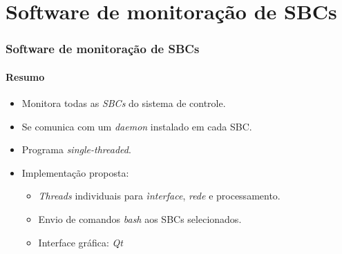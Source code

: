 \section{Software de monitoração de SBCs}

\begin{frame}
\frametitle{Software de monitoração de SBCs}
\framesubtitle{Resumo}

\begin{itemize}
  \item Monitora todas as \textit{SBCs} do sistema de controle.
  \vspace{12pt}
  \item	Se comunica com um \textit{daemon} instalado em cada SBC.
  \vspace{12pt}
  \item Programa \textit{single-threaded}.
  \vspace{12pt}
  \item Implementação proposta:
  \begin{itemize}
    \item \textit{Threads} individuais para \textit{ìnterface}, \textit{rede} e
    processamento.
    \item Envio de comandos \textit{bash} aos SBCs selecionados.
    \item Interface gráfica: \textit{Qt}
  \end{itemize}
\end{itemize}

\end{frame}

